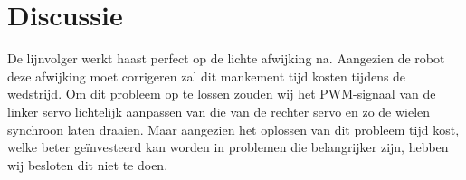\documentclass{report}
\begin{document}
\section{Discussie}
De lijnvolger werkt haast perfect op de lichte afwijking na. Aangezien de robot deze afwijking moet corrigeren zal dit mankement tijd kosten tijdens de wedstrijd. Om dit probleem op te lossen zouden wij het PWM-signaal van de linker servo lichtelijk aanpassen van die van de rechter servo en zo de wielen synchroon laten draaien. Maar aangezien het oplossen van dit probleem tijd kost, welke beter geïnvesteerd kan worden in problemen die belangrijker zijn, hebben wij besloten dit niet te doen.
\end{document}
